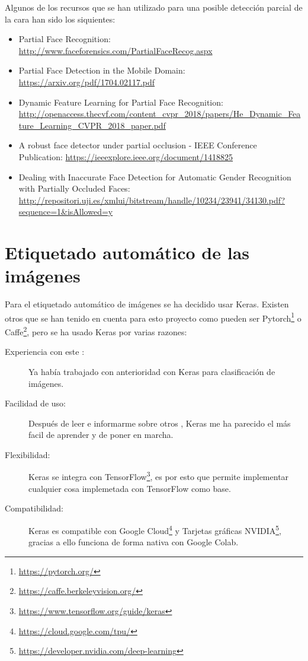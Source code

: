Algunos de los recursos que se han utilizado para una posible detección parcial de la cara han sido los siquientes:
\begin{itemize}
    \item Partial Face Recognition: \url{http://www.faceforensics.com/PartialFaceRecog.aspx}
    \item Partial Face Detection in the Mobile Domain: \url{https://arxiv.org/pdf/1704.02117.pdf}
    \item Dynamic Feature Learning for Partial Face Recognition: \url{http://openaccess.thecvf.com/content_cvpr_2018/papers/He_Dynamic_Feature_Learning_CVPR_2018_paper.pdf}
    \item A robust face detector under partial occlusion - IEEE Conference Publication: \url{https://ieeexplore.ieee.org/document/1418825}
    \item Dealing with Inaccurate Face Detection for Automatic Gender Recognition with Partially Occluded Faces: \url{http://repositori.uji.es/xmlui/bitstream/handle/10234/23941/34130.pdf?sequence=1&isAllowed=y}
\end{itemize}


\section{Etiquetado automático de las imágenes}

Para el etiquetado automático de imágenes se ha decidido usar Keras. Existen otros  que se han tenido en cuenta para esto proyecto como pueden ser Pytorch\footnote{\url{https://pytorch.org/}} o Caffe\footnote{\url{https://caffe.berkeleyvision.org/}}, pero se ha usado Keras por varias razones:

\begin{description}
    \item[Experiencia con este :] Ya había trabajado con anterioridad con Keras para clasificación de imágenes.
    \item[Facilidad de uso:] Después de leer e informarme sobre otros , Keras me ha parecido el más facil de aprender y de poner en marcha.
    \item[Flexibilidad:] Keras se integra con TensorFlow\footnote{\url{https://www.tensorflow.org/guide/keras}}, es por esto que permite implementar cualquier cosa implemetada con TensorFlow como base.
    \item[Compatibilidad:] Keras es compatible con Google Cloud\footnote{\url{https://cloud.google.com/tpu/}} y Tarjetas gráficas NVIDIA\footnote{\url{https://developer.nvidia.com/deep-learning}}, gracias a ello funciona de forma nativa con Google Colab.
\end{description}

